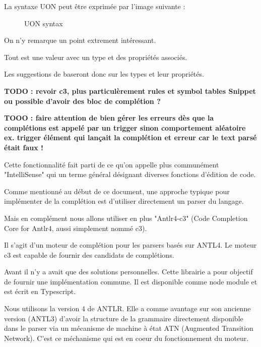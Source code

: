 \documentclass[
    iict, %
    il, %
]{heig-tb}
\begin{document}
La syntaxe UON peut être exprimée par l'image suivante :

\begin{figure}[!ht]
    \begin{center}
    \end{center}
    \caption[syntax]{\label{syntax} UON syntax}
\end{figure}

On n'y remarque un point extrement intéressant.

Tout est une valeur avec un type et des propriétés associés.

Les suggestions de baseront donc sur les types et leur propriétés.

\textbf{TODO : revoir c3, plus particulèrement rules et symbol tables
    Snippet ou possible d'avoir des bloc de complétion ?}

\textbf{TOOO : faire attention de bien gérer les erreurs dès que la complétions est appelé par un trigger sinon comportement aléatoire
    ex. trigger élément qui lançait la complétion et erreur car le text parsé était faux !
}

Cette fonctionnalité fait parti de ce qu'on appelle plus communément "IntelliSense" \cite{intelliSense} qui un terme général désignant diverses fonctions d'édition de code.

Comme mentionné au début de ce document, une approche typique pour implémenter de la complétion est d'utiliser directement un parser du langage.

Mais en complément nous allons utiliser en plus "Antlr4-c3" (Code Completion Core for Antlr4, aussi simplement nommé c3).

Il s'agit d'un moteur de complétion pour les parsers basés sur ANTL4. Le moteur c3 est capable de fournir des candidats de complétions.

Avant il n'y a avait que des solutions personnelles. Cette librairie a pour objectif de fournir une implémentation commune. Il est disponible comme node module et est écrit en Typescript.

Nous utilisons la version 4 de ANTLR. Elle a comme avantage sur son ancienne version (ANTL3) d'avoir la structure de la grammaire directement disponible dans le parser via
un mécanisme de machine à état ATN (Augmented Transition Network). C'est ce méchanisme qui est en coeur du fonctionnement du moteur.
\end{document}
